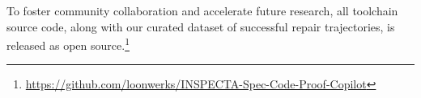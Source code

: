 \documentclass[conference]{IEEEtran}
\begin{document}
To foster community collaboration and accelerate future research, all toolchain source code, along with our curated dataset of successful repair trajectories, is released as open source.\footnote{\url{https://github.com/loonwerks/INSPECTA-Spec-Code-Proof-Copilot}}



\end{document}
